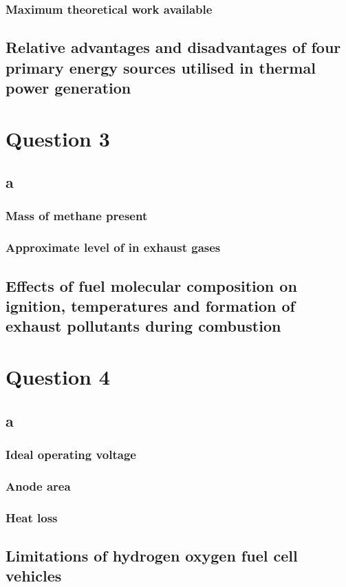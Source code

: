 \documentclass[11pt]{article}
\numberwithin{equation}{section}
\begin{document}
\subsubsection{Maximum theoretical work available}
\subsection{Relative advantages and disadvantages of four primary energy sources utilised in thermal power generation}
\section{Question 3}
\subsection{a}
\subsubsection{Mass of methane present}
\subsubsection{Approximate level of  in exhaust gases}
\subsection{Effects of fuel molecular composition on ignition, temperatures and formation of exhaust pollutants during combustion}
\section{Question 4}
\subsection{a}
\subsubsection{Ideal operating voltage}
\subsubsection{Anode area}
\subsubsection{Heat loss}
\subsection{Limitations of hydrogen oxygen fuel cell vehicles}
\end{document}
